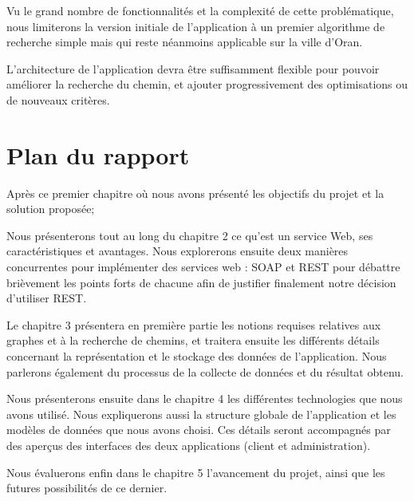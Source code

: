 Vu le grand nombre de fonctionnalités et la complexité de cette problématique, nous limiterons la version initiale de l'application à un premier algorithme de recherche simple mais qui reste néanmoins applicable sur la ville d'Oran.

L'architecture de l'application devra être suffisamment flexible pour pouvoir améliorer la recherche du chemin, et ajouter progressivement des optimisations ou de nouveaux critères.

\section{Plan du rapport}

Après ce premier chapitre où nous avons présenté les objectifs du projet et la solution proposée;

Nous présenterons tout au long du chapitre 2 ce qu'est un service Web, ses caractéristiques et avantages. Nous explorerons ensuite deux manières concurrentes pour implémenter des services web : \acrshort{SOAP} et REST pour débattre brièvement les points forts de chacune afin de justifier finalement notre décision d'utiliser REST.

Le chapitre 3 présentera en première partie les notions requises relatives aux graphes et à la recherche de chemins, et traitera ensuite les différents détails concernant la représentation et le stockage des données de l'application. Nous parlerons également du processus de la collecte de données et du résultat obtenu.

Nous présenterons ensuite dans le chapitre 4 les différentes technologies que nous avons utilisé. Nous expliquerons aussi la structure globale de l'application et les modèles de données que nous avons choisi. Ces détails seront accompagnés par des aperçus des interfaces des deux applications (client et administration).

Nous évaluerons enfin dans le chapitre 5 l'avancement du projet, ainsi que les futures possibilités de ce dernier.
